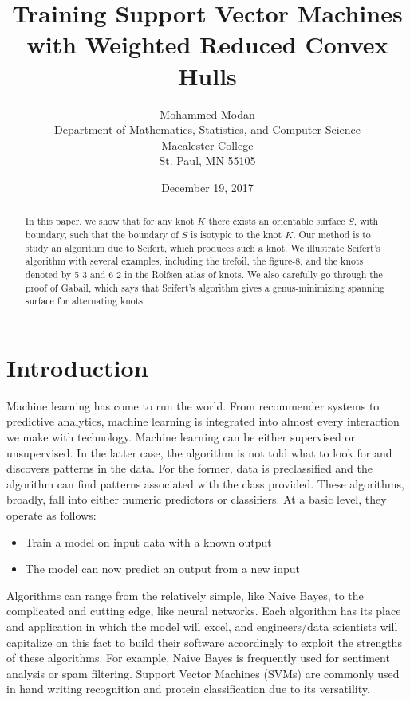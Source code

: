 \documentclass[11pt]{article}
\title{Training Support Vector Machines with Weighted Reduced Convex Hulls}
\author{Mohammed Modan \\  Department of Mathematics, Statistics, and Computer Science \\  Macalester College \\   St. Paul, MN 55105
}
\date{December 19, 2017}
\theoremstyle{remark}	  \newtheorem*{remark}{Remark}
\numberwithin{equation}{section}
\begin{document}
\maketitle

\begin{abstract}
\noindent
In this paper, we show that for any knot $K$ there exists an orientable surface $S$, with boundary, such that the boundary of $S$ is isotypic to the knot $K$.  Our method is to study an algorithm due to Seifert, which produces such a knot.  We illustrate Seifert's algorithm with several examples, including the trefoil, the figure-8, and the knots denoted by 5-3 and 6-2 in  the Rolfsen atlas of knots. We also carefully go through the proof of Gabail, which says that Seifert's algorithm gives a genus-minimizing spanning surface for alternating knots.

 \end{abstract}


\section{Introduction}

Machine learning has come to run the world. From recommender systems to predictive analytics, machine learning is integrated into almost every interaction we make with technology. Machine learning can be either supervised or unsupervised. In the latter case, the algorithm is not told what to look for and discovers patterns in the data. For the former, data is preclassified and the algorithm can find patterns associated with the class provided. These algorithms, broadly, fall into either numeric predictors or classifiers. At a basic level, they operate as follows:

\begin{itemize}
	\item Train a model on input data with a known output
	\item The model can now predict an output from a new input
\end{itemize}

Algorithms can range from the relatively simple, like Naive Bayes, to the complicated and cutting edge, like neural networks. Each algorithm has its place and application in which the model will excel, and engineers/data scientists will capitalize on this fact to build their software accordingly to exploit the strengths of these algorithms. For example, Naive Bayes is frequently used for sentiment analysis or spam filtering. Support Vector Machines (SVMs) are commonly used in hand writing recognition and protein classification due to its versatility.
\end{document}
